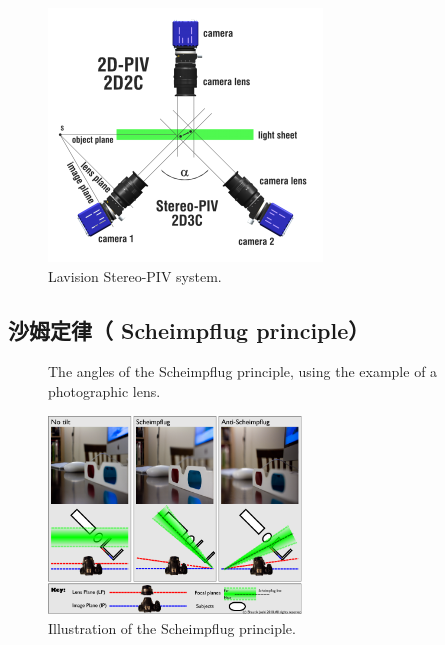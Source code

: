 \documentclass{article}
\begin{document}
\begin{figure}[htbp]
  \centering
  \includegraphics[width=.4\textwidth]{./figures/lavision-Stereo-PIV.png}
  \caption{Lavision Stereo-PIV system.}
\end{figure}

\subsection{沙姆定律（ Scheimpflug principle）}

\begin{figure}[htbp]
  \centering
  \caption{The angles of the Scheimpflug principle, using the example of a
  photographic lens.}
\end{figure}

\begin{figure}[htbp]
  \centering
  \includegraphics[width=0.6\textwidth]{./figures/tilt_camera.png}
  \caption{Illustration of the Scheimpflug principle.}
\end{figure}
\end{document}
